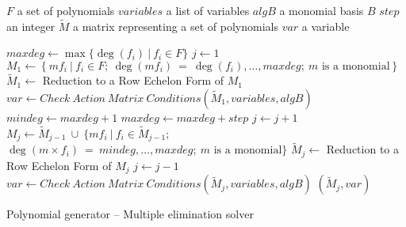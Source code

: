 \begin{algorithm}[ht]
  \begin{algorithmic}[1]
    \Require
      \Statex $F$ a set of polynomials
      \Statex $variables$ a list of variables
      \Statex $algB$ a monomial basis $B$
      \Statex $step$ an integer
    \Ensure
      \Statex $\tilde{M}$ a matrix representing a set of polynomials
      \Statex $var$ a variable
      \Statex

      \State $maxdeg \gets \max\{\deg(f_i)\ |\ f_i \in F\}$
      \State $j \gets 1$
      \State $M_1 \gets \left\{m f_i\ |\ f_i \in F;\ \deg(m f_i)\ =\ \deg(f_i),\dots,maxdeg;\ m \textrm{ is a monomial} \right\}$
      \State $\tilde{M}_1 \gets$ Reduction to a Row Echelon Form of $M_1$
      \State $var \gets Check\ Action\ Matrix\ Conditions(\tilde{M}_1, variables, algB)$
        \State $mindeg \gets maxdeg + 1$
        \State $maxdeg \gets maxdeg + step$
        \Repeat
          \State $j \gets j + 1$
	  \State $M_j \gets \tilde{M}_{j-1}\ \cup\ \Big\{m f_i\ |\ f_i \in \tilde{M}_{j-1};$
	  \StatexIndent[4]$\deg(m\times f_i)\ = \ mindeg,\dots,maxdeg;\ m \textrm{ is a monomial}\Big\}$
          \State $\tilde{M}_j \gets$ Reduction to a Row Echelon Form of $M_j$
        \label{alg:multiElGen:rue}
	\State $j \gets j - 1$\label{alg:multiElGen:shred}
        \State $var \gets Check\ Action\ Matrix\ Conditions(\tilde{M}_j, variables, algB)$
      \EndWhile
      \State \Return $(\tilde{M}_j, var)$
  \end{algorithmic}
  \caption{Polynomial generator -- Multiple elimination solver}
  \label{alg:multiElGen}
\end{algorithm}

